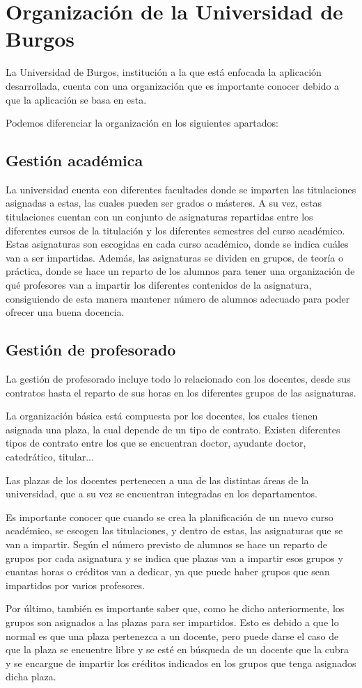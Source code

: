 \section{Organización de la Universidad de Burgos}
La Universidad de Burgos, institución a la que está enfocada la aplicación desarrollada, cuenta con una organización  que es importante conocer debido a que la aplicación se basa en esta.
 
Podemos diferenciar la organización en los siguientes apartados:

\subsection{Gestión académica}
La universidad cuenta con diferentes facultades donde se imparten las titulaciones asignadas a estas, las cuales pueden ser grados o másteres.
A su vez, estas titulaciones cuentan con un conjunto de asignaturas repartidas entre los diferentes cursos de la titulación y los diferentes semestres del curso académico. 
Estas asignaturas son escogidas en cada curso académico, donde se indica cuáles van a ser impartidas.
Además, las asignaturas se dividen en grupos, de teoría o práctica, donde se hace un reparto de los alumnos para tener una organización de qué profesores van a impartir los diferentes contenidos de la asignatura, consiguiendo de esta manera mantener número de alumnos adecuado para poder ofrecer una buena docencia.

\subsection{Gestión de profesorado}
La gestión de profesorado incluye todo lo relacionado con los docentes, desde sus contratos hasta el reparto de sus horas en los diferentes grupos de las asignaturas.

La organización básica está compuesta por los docentes, los cuales tienen asignada una plaza, la cual depende de un tipo de contrato. Existen diferentes tipos de contrato entre los que se encuentran doctor, ayudante doctor, catedrático, titular...

Las plazas de los docentes pertenecen a una de las distintas áreas de la universidad, que a su vez se encuentran integradas en los departamentos.

Es importante conocer que cuando se crea la planificación de un nuevo curso académico, se escogen las titulaciones, y dentro de estas, las asignaturas que se van a impartir. 
Según el número previsto de alumnos se hace un reparto de grupos por cada asignatura y se indica que plazas van a impartir esos grupos y cuantas horas o créditos van a dedicar, ya que puede haber grupos que sean impartidos por varios profesores.

Por último, también es importante saber que, como he dicho anteriormente, los grupos son asignados a las plazas para ser impartidos.
Esto es debido a que lo normal es que una plaza pertenezca a un docente, pero puede darse el caso de que la plaza se encuentre libre y se esté en búsqueda de un docente que la cubra y se encargue de impartir los créditos indicados en los grupos que tenga asignados dicha plaza.
